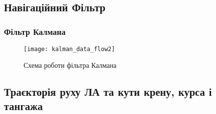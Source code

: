 \documentclass[ucs,compress]{beamer}    %
\begin{document}
\subsection{Навігаційний Фільтр}
\begin{frame} \frametitle{Фільтр Калмана} 
\begin{figure}[here]
\centering
\texttt{[image: kalman\_data\_flow2]}
\caption{Схема роботи фільтра Калмана}
\end{figure}
\end{frame}

\subsection{Траєкторія руху ЛА та кути крену, курса і тангажа} 
\end{document}
